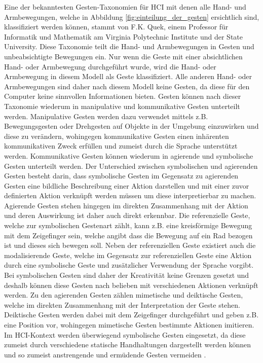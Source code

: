 Eine der bekanntesten Gesten-Taxonomien für HCI mit denen alle Hand- und Armbewegungen, welche in Abbildung \ref{fig:einteilung_der_gesten} ersichtlich sind, klassifiziert werden können, stammt von F.K. Quek, einem  Professor für Informatik und Mathematik am Virginia Polytechnic Institute und der State University. Diese Taxonomie teilt die Hand- und Armbewegungen in Gesten und unbeabsichtigte Bewegungen ein. Nur wenn die Geste mit einer absichtlichen Hand- oder Armbewegung durchgeführt wurde, wird die Hand- oder Armbewegung in diesem Modell als Geste klassifiziert. Alle anderen Hand- oder Armbewegungen sind daher nach diesem Modell keine Gesten, da diese für den Computer keine sinnvollen Informationen bieten. Gesten können nach dieser Taxonomie wiederum in manipulative und kommunikative Gesten unterteilt werden. Manipulative Gesten werden dazu verwendet mittels z.B. Bewegungsgesten oder Drehgesten auf Objekte in der Umgebung einzuwirken und diese zu verändern, wohingegen kommunikative Gesten einen inhärenten kommunikativen Zweck erfüllen und zumeist durch die Sprache unterstützt werden. Kommunikative Gesten können wiederum in agierende und symbolische Gesten unterteilt werden. Der Unterschied zwischen symbolischen und agierenden Gesten besteht darin, dass symbolische Gesten im Gegensatz zu agierenden Gesten eine bildliche Beschreibung einer Aktion darstellen und mit einer zuvor definierten Aktion verknüpft werden müssen um diese interpretierbar zu machen. Agierende Gesten stehen hingegen im direkten Zusammenhang mit der Aktion und deren Auswirkung ist daher auch direkt erkennbar. Die referenzielle Geste, welche zur symbolischen Gestenart zählt, kann z.B. eine kreisförmige Bewegung mit dem Zeigefinger sein, welche angibt dass die Bewegung auf ein Rad bezogen ist und dieses sich bewegen soll. Neben der referenziellen Geste existiert auch die modalisierende Geste, welche im Gegensatz zur referenziellen Geste eine Aktion durch eine symbolische Geste und zusätzlicher Verwendung der Sprache vorgibt. Bei symbolischen Gesten sind daher der Kreativität keine Grenzen gesetzt und deshalb können diese Gesten nach belieben mit verschiedenen Aktionen verknüpft werden. Zu den agierenden Gesten zählen mimetische und deiktische Gesten, welche im direkten Zusammenhang mit der Interpretation der Geste stehen. Deiktische Gesten werden dabei mit dem Zeigefinger durchgeführt und geben z.B. eine Position vor, wohingegen mimetische Gesten bestimmte Aktionen imitieren. Im HCI-Kontext werden überwiegend symbolische Gesten eingesetzt, da diese zumeist durch verschiedene statische Handhaltungen dargestellt werden können und so zumeist anstrengende und ermüdende Gesten vermeiden \cite[680]{pavlovic_visual_1997}.

